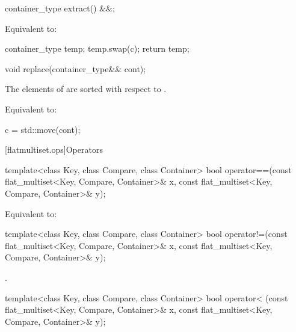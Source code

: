\begin{codeblock}
\begin{codeblock}
\begin{codeblock}
\begin{addedblock}
%
\begin{itemdecl}
container_type extract() &&;
\end{itemdecl}

\begin{itemdescr}
\effects Equivalent to:
\begin{codeblock}
container_type temp;
temp.swap(c);
return temp;
\end{codeblock}
\end{itemdescr}

%
\begin{itemdecl}
void replace(container_type&& cont);
\end{itemdecl}

\begin{itemdescr}
\pnum \expects
The elements of  are sorted with respect to .

\pnum
\effects Equivalent to:
\begin{codeblock}
c = std::move(cont);
\end{codeblock}
\end{itemdescr}

[flatmultiset.ops]{Operators}

%
\begin{itemdecl}
template<class Key, class Compare, class Container>
  bool operator==(const flat_multiset<Key, Compare, Container>& x,
                  const flat_multiset<Key, Compare, Container>& y);
\end{itemdecl}

\begin{itemdescr}
\pnum
\effects Equivalent to:
\end{itemdescr}

%
\begin{itemdecl}
template<class Key, class Compare, class Container>
  bool operator!=(const flat_multiset<Key, Compare, Container>& x,
                  const flat_multiset<Key, Compare, Container>& y);
\end{itemdecl}

\begin{itemdescr}
\pnum \returns {}.
\end{itemdescr}

%
\begin{itemdecl}
template<class Key, class Compare, class Container>
  bool operator< (const flat_multiset<Key, Compare, Container>& x,
                  const flat_multiset<Key, Compare, Container>& y);
\end{itemdecl}


\end{addedblock}
\end{codeblock}
\end{codeblock}
\end{codeblock}
